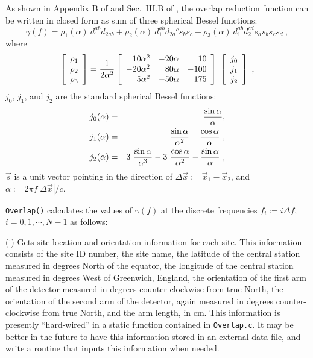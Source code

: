 \documentclass{article}
\begin{document}
As shown in Appendix B of \cite{flanagan} and Sec.~III.B of 
\cite{allenromano}, the overlap reduction function can be written in 
closed form as sum of three spherical Bessel functions:
%
\begin{equation}
\gamma(f)=\rho_1(\alpha)\ d_1^{ab}d_{2ab}
+\rho_2(\alpha)\ d_1^{ab}d_{2a}{}^c s_b s_c
+\rho_3(\alpha)\ d_1^{ab}d_2^{cd}s_a s_b s_c s_d\ ,
\label{e:closed1}
\end{equation}
%
where
%
\begin{equation}
\left[ 
\begin{array}{c}
\rho_1\\
\rho_2\\
\rho_3
\end{array}
\right]
=
{1\over 2\alpha^2}
\left[
\begin{array}{rrr}
 10\alpha^2 & -20\alpha   & 10\\
-20\alpha^2 &  80\alpha   & -100\\
  5\alpha^2 & -50\alpha   & 175
\end{array}
\right]\
\left[
\begin{array}{c}
j_0\\
j_1\\
j_2
\end{array}
\right]\ ,
\label{e:closed2}
\end{equation}
%
$j_0$, $j_1$, and $j_2$ are the standard spherical Bessel functions:
%
\begin{eqnarray}
j_0(\alpha)&=&{\sin\alpha\over\alpha} ,\nonumber\\ 
j_1(\alpha)&=&{\sin\alpha\over\alpha^2}-{\cos\alpha\over\alpha}\ ,
\label{e:closed3}\\ 
j_2(\alpha)&=&3\ {\sin\alpha\over\alpha^3}-3\ {\cos\alpha\over\alpha^2}
-{\sin\alpha\over\alpha}\ ,\nonumber
\end{eqnarray}
%
$\vec s$ is a unit vector pointing in the direction of 
$\Delta \vec x:=\vec x_1-\vec x_2$, and $\alpha:=2\pi f|\Delta\vec x|/c$.

{\tt Overlap()\/} calculates the values of $\gamma(f)$ at the discrete
frequencies $f_i:=i\Delta f$, $i=0,1,\cdots,N-1$ as follows:
%

(i) Gets site location and orientation information for each site.
This information consists of the site ID number, the site name, the 
latitude of the central station measured in degrees North of the 
equator, the longitude of the central station measured in degrees
West of Greenwich, England, the orientation of the first arm of
the detector measured in degrees counter-clockwise from true North,
the orientation of the second arm of the detector, again measured in 
degrees counter-clockwise from true North, and the arm length, in cm.
This information is presently ``hard-wired'' in a static function 
contained in {\tt Overlap.c}.
It may be better in the future to have this information stored in
an external data file, and write a routine that inputs this information 
when needed.
\end{document}
